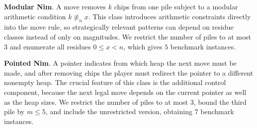 \documentclass[review]{elsarticle}
\newcommand{\set}[1]{\{ #1 \}}
\newcommand{\tuple}[1]{\langle {#1} \rangle}
\newcommand{\true}{\top}
\newcommand{\statevar}{\mathcal{X}}
\newcommand{\act}{\mathcal{A}}
\newcommand{\constraint}{\mathcal{C}}
\newcommand{\estate}{\mathcal{E}}
\newcommand{\pre}{\mathtt{pre}}
\newcommand{\eff}{\mathtt{eff}}
\newcommand{\nmodulo}{\not \equiv}
\begin{document}
\textbf{Modular Nim}. A move removes $k$ chips from one pile subject to a modular arithmetic condition $k \nmodulo_n x$.
This class introduces arithmetic constraints directly into the move rule, so strategically relevant patterns can depend on residue classes instead of only on magnitudes.
We restrict the number of piles to at most $3$ and enumerate all residues $0 \le x < n$, which gives $5$ benchmark instances.

\textbf{Pointed Nim}. A pointer indicates from which heap the next move must be made, and after removing chips the player must redirect the pointer to a different nonempty heap.
The crucial feature of this class is the additional control component, because the next legal move depends on the current pointer as well as the heap sizes.
We restrict the number of piles to at most $3$, bound the third pile by $m \le 5$, and include the unrestricted version, obtaining $7$ benchmark instances.
\end{document}
